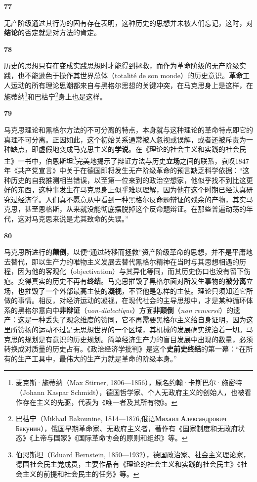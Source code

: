 \documentclass[fontset=fandol, a4paper, 12pt, openright]{ctexbook}
\makeatletter
\newcommand{\thesis}[1]{%
    \par\vspace{1.5em}%
    {\centering \textbf{\Large #1}\par}%
    \nobreak\vspace{0.5em}\nobreak
    \@afterindenttrue %
    \@afterheading    %
}
\makeatother
\begin{document}
\thesis{77}
无产阶级通过其行为的固有存在表明，这种历史的思想并未被人们忘记，这时，对\textbf{结论}的否定就是对方法的肯定。

\thesis{78}
历史的思想只有在变成实践思想时才能得到拯救，而作为革命阶级的无产阶级实践，也不能逊色于操作其世界总体（totalité de son monde）的历史意识。\textbf{革命}工人运动的所有理论思潮都来自与黑格尔思想的关键冲突，在马克思身上是这样，在施蒂纳\footnote{麦克斯·施蒂纳（Max Stirner, 1806—1856），原名约翰·卡斯巴尔·施密特（Johann Kaspar Schmidt），德国哲学家、个人无政府主义的创始人，也被看作存在主义的先驱，代表为《唯一者及其所有物》。}和巴枯宁\footnote{巴枯宁（Mikhaïl Bakounine, 1814—1876,俄语Михаил Александрович Бакунин），俄国早期革命家、无政府主义者，著作有《国家制度和无政府状态》《上帝与国家》《国际革命协会的原则和组织》等。}身上也是这样。

\thesis{79}
马克思理论和黑格尔方法的不可分离的特点，本身就与这种理论的革命特点即它的真理不可分离。正因如此，这个初始关系通常被人忽视或误解，或者还被斥责为一种缺点，即虚假地变成马克思主义的\textbf{学说}。在《理论的社会主义和实践的社会民主》一书中，伯恩斯坦\footnote{伯恩斯坦（Eduard Bernstein, 1850—1932），德国政治家、社会主义理论家，德国社会民主党成员，主要作品有《理论的社会主义和实践的社会民主》《社会主义的前提和社会民主的任务》等。}完美地揭示了辩证方法与历史\textbf{立场}之间的联系，哀叹1847年《共产党宣言》中关于在德国即将发生无产阶级革命的预言缺乏科学依据：“这种历史的自我推测相当错误，以至第一位来到的政治空想家，他似乎找不到比这更好的东西，这种事发生在马克思身上似乎难以理解，因为他在这个时期已经认真研究过经济学。人们真不愿意从中看到一种黑格尔反命题辩证的残余的产物，其实马克思，甚至恩格斯，从来就没能彻底摆脱掉这个反命题辩证。在那些普遍动荡的年代，这对马克思来说是尤其致命的失误。”

\thesis{80}
马克思所进行的\textbf{颠倒}，以便“通过转移而拯救”资产阶级革命的思想，并不是平庸地去替代，即以生产力的唯物主义发展去替代黑格尔精神在当时与其思想相遇的历程，因为他的客观化（objectivation）与其异化等同，而其历史伤口也没有留下伤疤。变得真实的历史不再有\textbf{终结}。马克思摧毁了黑格尔面对所发生事物的\textbf{被分离}立场，也摧毁了一个外部最高主使的\textbf{凝视}，不管他是怎样的主使。理论只须知道它所做的事情。相反，对经济运动的凝视，在现代社会的主导思想中，才是某种循环体系的黑格尔意向中\textbf{非辩证}（\textit{non-dialectique}）方面\textbf{非颠倒}（\textit{non renversé}）的遗产：这是一种丢失了观念维度的赞同，它不再需要黑格尔主义给自身证明，因为这里所赞扬的运动不过是无思想世界的一个区域，其机械的发展确实统治着一切。马克思的规划是有意识的历史规划。简单经济生产力的盲目发展中出现的数量，必须转换成对质量的历史占有。《政治经济学批判》是这个\textbf{史前史终结}的第一幕：“在所有的生产工具中，最伟大的生产力就是革命的阶级本身。”
\end{document}

